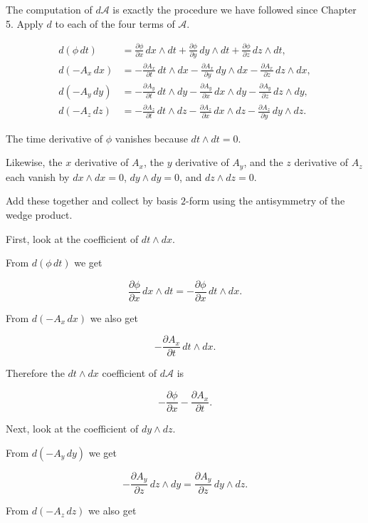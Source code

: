 The computation of \(d\mathcal{A}\) is exactly the procedure we have
followed since Chapter 5. Apply \(d\) to each of the four terms of
\(\mathcal{A}\).

\[
\begin{aligned}
d(\phi\,dt)
&=
\frac{\partial\phi}{\partial x}\,dx\wedge dt
+
\frac{\partial\phi}{\partial y}\,dy\wedge dt
+
\frac{\partial\phi}{\partial z}\,dz\wedge dt,
\\[0.5em]
d(-A_x\,dx)
&=
-\frac{\partial A_x}{\partial t}\,dt\wedge dx
-
\frac{\partial A_x}{\partial y}\,dy\wedge dx
-
\frac{\partial A_x}{\partial z}\,dz\wedge dx,
\\[0.5em]
d(-A_y\,dy)
&=
-\frac{\partial A_y}{\partial t}\,dt\wedge dy
-
\frac{\partial A_y}{\partial x}\,dx\wedge dy
-
\frac{\partial A_y}{\partial z}\,dz\wedge dy,
\\[0.5em]
d(-A_z\,dz)
&=
-\frac{\partial A_z}{\partial t}\,dt\wedge dz
-
\frac{\partial A_z}{\partial x}\,dx\wedge dz
-
\frac{\partial A_z}{\partial y}\,dy\wedge dz.
\end{aligned}
\]

The time derivative of \(\phi\) vanishes because \(dt\wedge dt=0\).

Likewise, the \(x\) derivative of \(A_x\), the \(y\) derivative of
\(A_y\), and the \(z\) derivative of \(A_z\) each vanish by
\(dx\wedge dx=0\), \(dy\wedge dy=0\), and \(dz\wedge dz=0\).

Add these together and collect by basis \(2\)-form using the
antisymmetry of the wedge product.

First, look at the coefficient of \(dt\wedge dx\).

From \(d(\phi\,dt)\) we get

\[
\frac{\partial\phi}{\partial x}\,dx\wedge dt
=
-\frac{\partial\phi}{\partial x}\,dt\wedge dx.
\]

From \(d(-A_x\,dx)\) we also get

\[
-\frac{\partial A_x}{\partial t}\,dt\wedge dx.
\]

Therefore the \(dt\wedge dx\) coefficient of \(d\mathcal{A}\) is

\[
-\frac{\partial\phi}{\partial x}
-
\frac{\partial A_x}{\partial t}.
\]

Next, look at the coefficient of \(dy\wedge dz\).

From \(d(-A_y\,dy)\) we get

\[
-\frac{\partial A_y}{\partial z}\,dz\wedge dy
=
\frac{\partial A_y}{\partial z}\,dy\wedge dz.
\]

From \(d(-A_z\,dz)\) we also get

